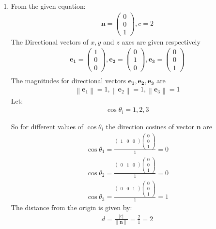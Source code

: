 \documentclass[12pt]{article}
\providecommand{\norm}[1]{\left\lVert#1\right\rVert}
\newcommand{\myvec}[1]{\ensuremath{\begin{pmatrix}#1\end{pmatrix}}}
\let\vec\mathbf
\begin{document}
\begin{enumerate}
\item From the given equation:
	\begin{align}
		\vec{n}=\myvec{0\\0\\1},c=2
			\end{align}
			The Directional vectors of $x,y$ and $z$ axes are given respectively 
			\begin{align}
			\vec{e_1}=\myvec{1\\0\\0},\vec{e_2}=\myvec{0\\1\\0},\vec{e_3}=\myvec{0\\0\\1}\\
			\end{align}
			The magnitudes for directional vectors $\vec{e_1},\vec{e_2},\vec{e_3}$ are
			\begin{align}
			\norm{\vec{e}_1}=1,\norm{\vec{e}_2}=1,\norm{\vec{e}_3}=1
			\end{align}
	Let:
	\begin{align}
	\cos\theta_i=1,2,3
	\end{align}
	
		So for different values of $\cos\theta_i$ the direction cosines of vector $\vec{n}$ are
		\begin{align}
			\cos\theta_1=\frac{\myvec{1&0&0}\myvec{0 \\ 0\\1}}{1}=0\\
			\cos\theta_2=\frac{\myvec{0&1&0}\myvec{0 \\ 0\\1}}{1}=0\\
			\cos\theta_3=\frac{\myvec{0&0&1}\myvec{0\\0\\1}}{1}=1
		\end{align}
	The distance from the origin is given by:
		\begin{align}
			d=\frac{|c|}{\norm{\vec{n}}}=\frac{2}{1}=2
		\end{align}


\end{enumerate}
\end{document}
